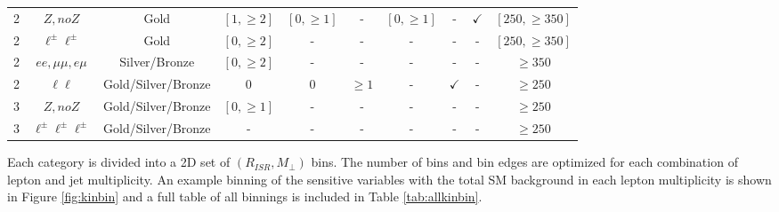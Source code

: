 \begin{table}
\begin{adjustwidth}{-0.7in}{-1in}
\begin{tabular}{|c|c|c|c|c|c|c|c|c|c|}
2 & $Z, no Z$ & Gold & $[1,\geq 2]$ & $[0, \geq 1]$& - & $[0,\geq 1]$ & - & $\checkmark$ & $[250,\geq350]$  \\
2 & $\ell^\pm \ell^\pm$ & Gold & $[0,\geq 2]$ & - & - &  - & - & - & $[250,\geq350]$ \\
2 & $ee, \mu\mu, e\mu$ & Silver/Bronze & $[0,\geq 2]$ & - & - & - & - & - & $\geq350$ \\
2 & $\ell \ell$ & Gold/Silver/Bronze & 0 & 0 & $\geq 1 $ & - & $\checkmark$ & - & $\geq 250$\\
\hline
3 & $Z, no Z$ & Gold/Silver/Bronze & $[0,\geq 1]$ & - & - & - & - & - & $\geq 250$ \\
3 & $\ell^\pm \ell^\pm \ell^\pm$ & Gold/Silver/Bronze & - & - & -& - & - & -& $\geq 250$ \\
\hline
\end{tabular} 
\end{adjustwidth}
\label{tab:cats}
\end{table}



Each category is divided into a 2D set of $(R_{ISR}, M_\perp)$ bins. The number of bins and bin edges are optimized for each combination of lepton and jet multiplicity. An example binning of the sensitive variables with the total SM background in each lepton multiplicity is shown in Figure \ref{fig:kinbin} and a full table of all binnings is included in Table \ref{tab:allkinbin}.

